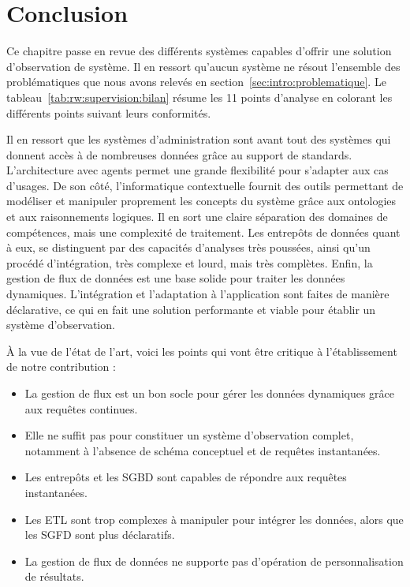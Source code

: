 \section{Conclusion}
Ce chapitre passe en revue des différents systèmes capables d'offrir une solution d'observation de système. Il en ressort qu'aucun système ne résout l'ensemble des problématiques que nous avons relevés en section~\ref{sec:intro:problematique}. Le tableau~\ref{tab:rw:supervision:bilan} résume les 11 points d'analyse en colorant les différents points suivant leurs conformités. 

Il en ressort que les systèmes d'administration sont avant tout des systèmes qui donnent accès à de nombreuses données grâce au support de standards. L'architecture avec agents permet une grande flexibilité pour s'adapter aux cas d'usages. De son côté, l'informatique contextuelle fournit des outils permettant de modéliser et manipuler proprement les concepts du système grâce aux ontologies et aux raisonnements logiques. Il en sort une claire séparation des domaines de compétences, mais une complexité de traitement. Les entrepôts de données quant à eux, se distinguent par des capacités d'analyses très poussées, ainsi qu'un procédé d'intégration, très complexe et lourd, mais très complètes. Enfin, la gestion de flux de données est une base solide pour traiter les données dynamiques. L'intégration et l'adaptation à l'application sont faites de manière déclarative, ce qui en fait une solution performante et viable pour établir un système d'observation.

À la vue de l'état de l'art, voici les points qui vont être critique à l'établissement de notre contribution :
\begin{itemize}
    \item La gestion de flux est un bon socle pour gérer les données dynamiques grâce aux requêtes continues.
    \item Elle ne suffit pas pour constituer un système d'observation complet, notamment à l'absence de schéma conceptuel et de requêtes instantanées.
    \item Les entrepôts et les SGBD sont capables de répondre aux requêtes instantanées.
    \item Les ETL sont trop complexes à manipuler pour intégrer les données, alors que les SGFD sont plus déclaratifs.
    \item La gestion de flux de données ne supporte pas d'opération de personnalisation de résultats.
\end{itemize}

